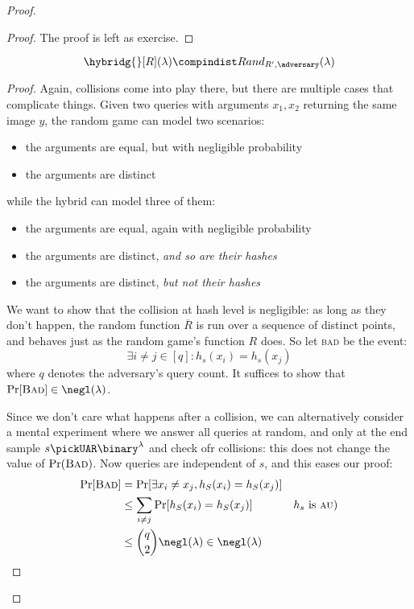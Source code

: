 \begin{proof}
    \begin{proof}
        The proof is left as exercise.
    \end{proof}

    \begin{lemma}
        \[
            \hybridg{}[R](\lambda) \compindist Rand_{R', \adversary}(\lambda)
        \]
    \end{lemma}

    \begin{proof}

        Again, collisions come into play there, but there are multiple cases that complicate things. Given two queries with arguments $x_1, x_2$ returning the same image $y$, the random game can model two scenarios:

        \begin{itemize}
            \item the arguments are equal, but with negligible probability
            \item the arguments are distinct
        \end{itemize}

        while the hybrid can model three of them:

        \begin{itemize}
            \item the arguments are equal, again with negligible probability
            \item the arguments are distinct, \emph{and so are their hashes}
            \item the arguments are distinct, \emph{but not their hashes}
        \end{itemize}
    
        We want to show that the collision at hash level is negligible: as long as they don't happen, the random function $\overline{R}$ is run over a sequence of distinct points, and behaves just as the random game's function $R$ does. So let \textsc{bad} be the event:
        \[
            \exists i \neq j \in [q] : h_s(x_i) = h_s(x_j)
        \]
        where $q$ denotes the adversary's query count. It suffices to show that $\Pr[\textsc{Bad}] \in \negl(\lambda)$.

        Since we don't care what happens after a collision, we can alternatively consider a mental experiment where we answer all queries at random, and only at the end sample $s \pickUAR \binary^\lambda$ and check ofr collisions: this does not change the value of $\Pr(\textsc{Bad})$. Now queries are independent of $s$, and this eases our proof:
        \begin{align*}
            \Pr[\textsc{Bad}] &= \Pr[\exists x_i \neq x_j, h_S(x_i) = h_S(x_j)] &                               \\
            &\leq \sum_{i \neq j} \Pr[h_S(x_i) = h_S(x_j)]                      & \text{$h_s$ is \textsc{au})}  \\
            &\leq \binom{q}{2} \negl(\lambda) \in \negl(\lambda)                &
        \end{align*}


\end{proof}
\end{proof}
